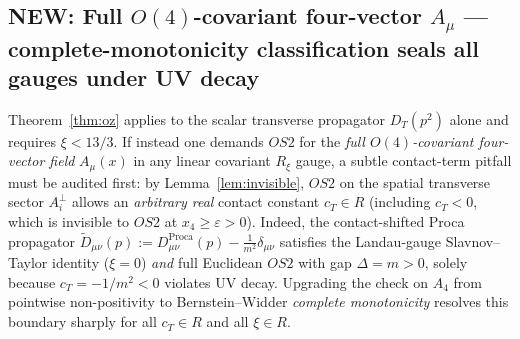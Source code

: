 \documentclass[11pt,a4paper]{article}
\def\R{R}\def\N{N}\def\Q{Q}\def\Z{Z}\def\Class{C}\def\OS{OS}\def\Gap{Gap}%
\theoremstyle{plain}
\theoremstyle{definition}
\theoremstyle{remark}
\newcommand{\R}{\mathbb{R}}\newcommand{\N}{\mathbb{N}}\newcommand{\Q}{\mathbb{Q}}
\newcommand{\Z}{\mathbb{Z}}\newcommand{\Spec}{\operatorname{Spec}}
\newcommand{\OS}{\mathrm{OS}}\newcommand{\Gap}{\mathrm{Gap}}
\newcommand{\Class}{\mathcal{C}}\newcommand{\Htot}{\mathcal{H}}
\renewcommand{\_}{\oldunderscore\allowbreak}
\begin{document}
\subsection{NEW: Full \texorpdfstring{$O(4)$}{O(4)}-covariant four-vector \texorpdfstring{$A_\mu$}{A\_mu} --- complete-monotonicity classification seals all gauges under UV decay}\label{sub:covA4}
Theorem~\ref{thm:oz} applies to the scalar transverse propagator $D_T(p^2)$ alone and requires $\xi<13/3$. If instead one demands $\OS2$ for the \emph{full $O(4)$-covariant four-vector field} $A_\mu(x)$ in any linear covariant $R_\xi$ gauge, a subtle contact-term pitfall must be audited first: by Lemma~\ref{lem:invisible}, $\OS2$ on the spatial transverse sector $A_i^\perp$ allows an \emph{arbitrary real} contact constant $c_T\in\R$ (including $c_T<0$, which is invisible to $\OS2$ at $x_4\ge\varepsilon>0$). Indeed, the contact-shifted Proca propagator $\widetilde{D}_{\mu\nu}(p):=D_{\mu\nu}^{\mathrm{Proca}}(p)-\frac{1}{m^2}\delta_{\mu\nu}$ satisfies the Landau-gauge Slavnov--Taylor identity ($\xi=0$) \emph{and} full Euclidean $\OS2$ with gap $\Delta=m>0$, solely because $c_T=-1/m^2<0$ violates UV decay. Upgrading the check on $A_4$ from pointwise non-positivity to Bernstein--Widder \emph{complete monotonicity} resolves this boundary sharply for all $c_T\in\R$ and all $\xi\in\R$.
\end{document}
